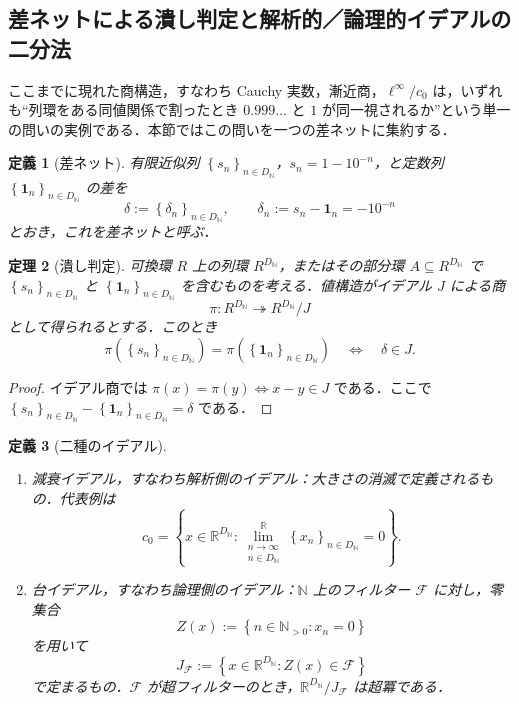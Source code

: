 \documentclass[a4paper,11pt]{ltjsarticle}
\theoremstyle{jpdef}
\newtheorem{definition}{定義}[section]
\theoremstyle{jpthm}
\newtheorem{theorem}[definition]{定理}
\newcommand{\N}{\mathbb{N}}
\newcommand{\R}{\mathbb{R}}
\newcommand{\Ns}{\N_{>0}}
\newcommand{\DN}{D_{\N}}
\newcommand{\set}[1]{\left\{#1\right\}}
\newcommand{\seq}[2]{\left\{#1\right\}_{#2}}
\begin{document}
\subsection{差ネットによる潰し判定と解析的／論理的イデアルの二分法}

ここまでに現れた商構造，すなわち Cauchy 実数，漸近商，\(\ell^\infty/c_0\) は，いずれも``列環をある同値関係で割ったとき \(0.999\ldots\) と \(1\) が同一視されるか''という単一の問いの実例である．本節ではこの問いを一つの差ネットに集約する．

\begin{definition}[差ネット]
有限近似列 \(\seq{s_n}{n\in\DN}\)，\(s_n=1-10^{-n}\)，と定数列 \(\seq{\mathbf1_n}{n\in\DN}\) の差を
\[
  \delta:=\seq{\delta_n}{n\in\DN},
  \qquad
  \delta_n:=s_n-\mathbf1_n=-10^{-n}
\]
とおき，これを差ネットと呼ぶ．
\end{definition}

\begin{theorem}[潰し判定]
可換環 \(R\) 上の列環 \(R^{\DN}\)，またはその部分環 \(A\subseteq R^{\DN}\) で \(\seq{s_n}{n\in\DN}\) と \(\seq{\mathbf1_n}{n\in\DN}\) を含むものを考える．値構造がイデアル \(J\) による商
\[
  \pi:R^{\DN}\twoheadrightarrow R^{\DN}/J
\]
として得られるとする．このとき
\[
  \pi(\seq{s_n}{n\in\DN})=\pi(\seq{\mathbf1_n}{n\in\DN})
  \quad\Longleftrightarrow\quad
  \delta\in J.
\]
\end{theorem}

\begin{proof}
イデアル商では \(\pi(x)=\pi(y)\Longleftrightarrow x-y\in J\) である．ここで \(\seq{s_n}{n\in\DN}-\seq{\mathbf1_n}{n\in\DN}=\delta\) である．
\end{proof}

\begin{definition}[二種のイデアル]
\begin{enumerate}
\item 減衰イデアル，すなわち解析側のイデアル：大きさの消滅で定義されるもの．代表例は
\[
  c_0=\set{x\in\R^{\DN}:\lim_{\substack{n\to\infty\\ n\in\DN}}^{\R}\seq{x_n}{n\in\DN}=0}.
\]
\item 台イデアル，すなわち論理側のイデアル：\(\N\) 上のフィルター \(\mathcal F\) に対し，零集合
\[
  Z(x):=\set{n\in\Ns:x_n=0}
\]
を用いて
\[
  J_{\mathcal F}:=\set{x\in\R^{\DN}:Z(x)\in\mathcal F}
\]
で定まるもの．\(\mathcal F\) が超フィルターのとき，\(\R^{\DN}/J_{\mathcal F}\) は超冪である．
\end{enumerate}
\end{definition}
\end{document}
